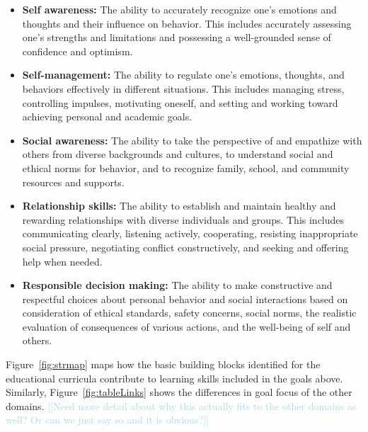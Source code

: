 \documentclass[prodmode,acmtochi]{acmsmall}
\newcommand{\todo}[1]{\textrm{\textrm{\textcolor{LightBlue}{[[#1]]}}}}
\begin{document}
%
%
\begin{itemize}
        \item {\bf Self awareness: }
                        The ability to accurately recognize one’s emotions and thoughts and their influence on behavior. This includes accurately assessing one’s strengths and limitations and possessing a well-grounded sense of confidence and optimism.
        \item {\bf Self-management: }
                         The ability to regulate one’s emotions, thoughts, and behaviors effectively in different situations. This includes managing stress, controlling impulses, motivating oneself, and setting and working toward achieving personal and academic goals.
        \item {\bf Social awareness: }
                         The ability to take the perspective of and empathize with others from diverse backgrounds and cultures, to understand social and ethical norms for behavior, and to recognize family, school, and community resources and supports.
        \item {\bf Relationship skills: }
                        The ability to establish and maintain healthy and rewarding relationships with diverse individuals and groups. This includes communicating clearly, listening actively, cooperating, resisting inappropriate social pressure, negotiating conflict constructively, and seeking and offering help when needed.
        \item {\bf Responsible decision making: }
                        The ability to make constructive and respectful choices about personal behavior and social interactions based on consideration of ethical standards, safety concerns, social norms, the realistic evaluation of consequences of various actions, and the well-being of self and others.
\end{itemize}
 
 Figure~\ref{fig:strmap} maps how the basic building blocks identified for the educational curricula contribute to learning skills included in the goals above. Similarly, Figure~\ref{fig:tableLinks} shows the differences in goal focus of the other domains. \todo{Need more detail about why this actually fits to the other domains as well? Or can we just say so and it is obvious?}\medskip
 
\end{document}
